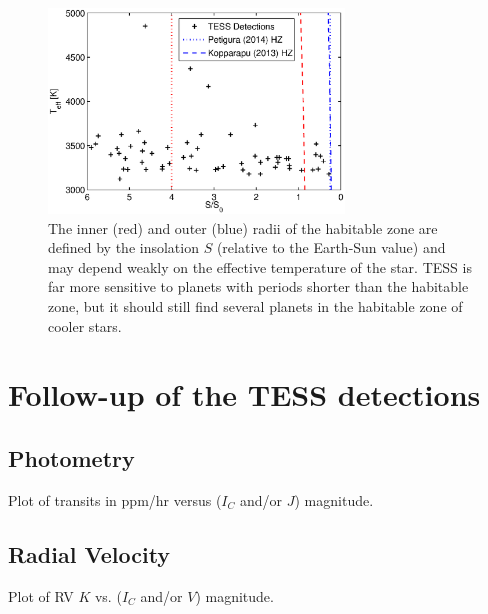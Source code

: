 \documentclass[preprint]{aastex}
\begin{document}
\begin{figure}[hbtp]
\begin{center}
\includegraphics[width=0.7\textwidth]{hz.eps}
\caption{The inner (red) and outer (blue) radii of the habitable zone are defined by the insolation $S$ (relative to the Earth-Sun value) and may depend weakly on the effective temperature of the star. TESS is far more sensitive to planets with periods shorter than the habitable zone, but it should still find several planets in the habitable zone of cooler stars.}
\end{center}
\end{figure}

\section{Follow-up of the TESS detections}
\subsection{Photometry}
Plot of transits in ppm/hr versus ($I_C$ and/or $J$) magnitude.
\subsection{Radial Velocity}
Plot of RV $K$ vs. ($I_C$ and/or $V$) magnitude.


\end{document}
